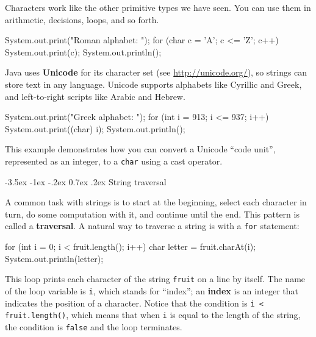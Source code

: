 \documentclass[12pt]{book}
\makeatletter
\theoremstyle{exercise}
\newcommand{\java}[1]{\verb"#1"}
\renewcommand{\section}{\@startsection{section}{1}{\z@}%
    {-3.5ex \@plus -1ex \@minus -.2ex}%
    {0.7ex \@plus.2ex}%
    {\normalfont\Large\bfseries}}
\newcommand{\java}[1]{\lstinline{#1}} %
\makeatother
\begin{document}
Characters work like the other primitive types we have seen.
You can use them in arithmetic, decisions, loops, and so forth.

\begin{code}
    System.out.print("Roman alphabet: ");
    for (char c = 'A'; c <= 'Z'; c++) {
        System.out.print(c);
    }
    System.out.println();
\end{code}


Java uses {\bf Unicode} for its character set (see \url{http://unicode.org/}), so strings can store text in any language.
Unicode supports alphabets like Cyrillic and Greek, and left-to-right scripts like Arabic and Hebrew.

\begin{code}
    System.out.print("Greek alphabet: ");
    for (int i = 913; i <= 937; i++) {
        System.out.print((char) i);
    }
    System.out.println();
\end{code}

This example demonstrates how you can convert a Unicode ``code unit'', represented as an integer, to a \java{char} using a cast operator.


\section{String traversal}
\label{traverse}


A common task with strings is to start at the beginning, select each character in turn, do some computation with it, and continue until the end.
This pattern is called a {\bf traversal}.
A natural way to traverse a string is with a \java{for} statement:

\begin{code}
    for (int i = 0; i < fruit.length(); i++) {
        char letter = fruit.charAt(i);
        System.out.println(letter);
    }
\end{code}


This loop prints each character of the string \java{fruit} on a line by itself.
The name of the loop variable is \java{i}, which stands for ``index''; an {\bf index} is an integer that indicates the position of a character.
Notice that the condition is \java{i < fruit.length()}, which means that when \java{i} is equal to the length of the string, the condition is \java{false} and the loop terminates.
\end{document}
